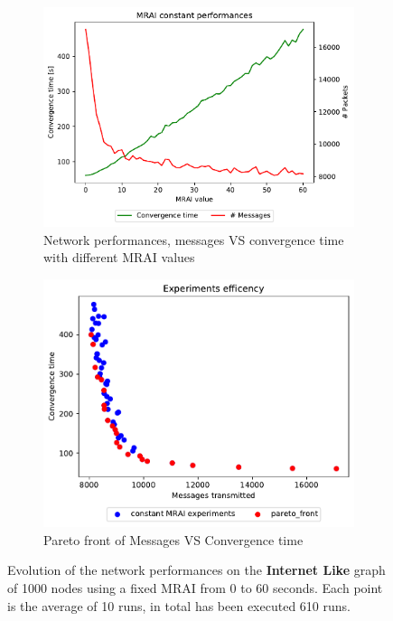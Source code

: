 \begin{figure}[h]
     \centering
     \begin{subfigure}[b]{0.49\textwidth}
         \centering
         \includegraphics[width=\textwidth]{images/internet_like/1000/constantMRAI/internet_like-constant_mrai_evolution.pdf}
		 \caption{Network performances, messages VS convergence time with different
			\ac{MRAI} values}
         \label{fig:internet_like_1000_constant_evolution_evolution}
     \end{subfigure}
     \hfill
     \begin{subfigure}[b]{0.49\textwidth}
         \centering
         \includegraphics[width=\textwidth]{images/internet_like/1000/constantMRAI/internet_like-constant.pdf}
		 \caption{Pareto front of Messages VS Convergence time}
         \label{fig:internet_like_1000_constant_evolution_paretoFront}
     \end{subfigure}
		\caption{Evolution of the network performances on the \textbf{Internet Like} graph
			of \num{1000} nodes using a fixed \ac{MRAI} from \num{0} to \num{60} seconds.
			Each point is the average of \num{10} runs, in total has been executed
			\num{610} runs.}
        \label{fig:internet_like_1000_constant_evolution}
\end{figure}

